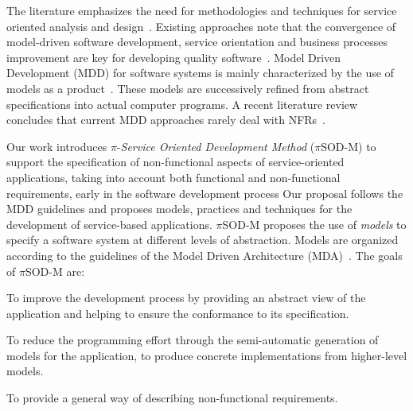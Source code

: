 \documentclass{singlecol-new}
\theoremstyle{TH}{
\newtheorem{lemma}{Lemma}
\newtheorem{theorem}[lemma]{Theorem}
\newtheorem{corrolary}[lemma]{Corrolary}
\newtheorem{conjecture}[lemma]{Conjecture}
\newtheorem{proposition}[lemma]{Proposition}
\newtheorem{claim}[lemma]{Claim}
\newtheorem{stheorem}[lemma]{Wrong Theorem}
\newtheorem{algorithm}{Algorithm}
}
\theoremstyle{THrm}{
\newtheorem{definition}{Definition}[section]
\newtheorem{question}{Question}[section]
\newtheorem{remark}{Remark}
\newtheorem{scheme}{Scheme}
}
\theoremstyle{THhit}{
\newtheorem{case}{Case}[section]
}
\theoremstyle{THhsl}{
\newtheorem{example}{Example}
}
\newcommand{\pisodm}[0]{$\pi$SOD-M\xspace}
\begin{document}
The literature emphasizes the need for meth\-od\-ol\-o\-gies and techniques for service oriented analysis and design~\cite{Papazoglou2007}.
Existing approaches note that the convergence of model-driven soft\-ware development, service orientation  and  busi\-ness processes improvement are key for developing quality software~\cite{watson}.
Model Driven Development (MDD)  for software systems is mainly characterized by the use of models as a product~\cite{Selic03}.
These models are successively refined from abstract specifications into actual computer programs. 
A recent literature review  concludes that current MDD approaches rarely deal with NFRs~\cite{Ameller201542}\footnotemark {}.

Our work introduces $\pi$-\textit{Service Oriented Development Method} (\pisodm) to support the specification of non-functional aspects of service-oriented applications, taking into account both functional and non-functional requirements, early in the software development process\footnotemark {}
Our proposal follows the MDD guidelines and proposes models, practices and techniques for the development of service-based applications.  
\pisodm proposes  the use of \textit{models} to specify a software system at different levels of abstraction.
Models are organized according to the guidelines of the Model Driven Archi\-tec\-ture (MDA)~\cite{miller}.
The goals of  \pisodm are:

\begin{compactenum}[i.]
\item To improve the development process by providing an abstract view of the application and helping to ensure the conformance to its specification.
\item To reduce the programming effort through the semi-automatic generation of  models for the application,  to produce concrete implementations from higher-level models.
\item To provide a general way of describing non-functional requirements.
\end{compactenum}
\end{document}
